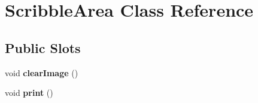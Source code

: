 \hypertarget{classScribbleArea}{\section{\-Scribble\-Area \-Class \-Reference}
\label{classScribbleArea}
}
\subsection*{\-Public \-Slots}
\begin{DoxyCompactItemize}
\item 
\hypertarget{classScribbleArea_a816e9d0163d4b2c921af229bb966197f}{void {\bfseries clear\-Image} ()}\label{classScribbleArea_a816e9d0163d4b2c921af229bb966197f}

\item 
\hypertarget{classScribbleArea_a04ee2d8fe0235f31fb4c6e5e52dd3112}{void {\bfseries print} ()}\label{classScribbleArea_a04ee2d8fe0235f31fb4c6e5e52dd3112}

\end{DoxyCompactItemize}
